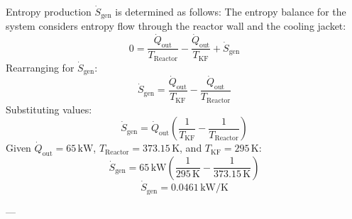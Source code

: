 Entropy production \( \dot{S}_{\text{gen}} \) is determined as follows:  
The entropy balance for the system considers entropy flow through the reactor wall and the cooling jacket:  
\[
0 = \frac{\dot{Q}_{\text{out}}}{T_{\text{Reactor}}} - \frac{\dot{Q}_{\text{out}}}{T_{\text{KF}}} + \dot{S}_{\text{gen}}
\]  
Rearranging for \( \dot{S}_{\text{gen}} \):  
\[
\dot{S}_{\text{gen}} = \frac{\dot{Q}_{\text{out}}}{T_{\text{KF}}} - \frac{\dot{Q}_{\text{out}}}{T_{\text{Reactor}}}
\]  
Substituting values:  
\[
\dot{S}_{\text{gen}} = \dot{Q}_{\text{out}} \left( \frac{1}{T_{\text{KF}}} - \frac{1}{T_{\text{Reactor}}} \right)
\]  
Given \( \dot{Q}_{\text{out}} = 65 \, \text{kW} \), \( T_{\text{Reactor}} = 373.15 \, \text{K} \), and \( T_{\text{KF}} = 295 \, \text{K} \):  
\[
\dot{S}_{\text{gen}} = 65 \, \text{kW} \left( \frac{1}{295 \, \text{K}} - \frac{1}{373.15 \, \text{K}} \right)
\]  
\[
\dot{S}_{\text{gen}} = 0.0461 \, \text{kW/K}
\]  

---